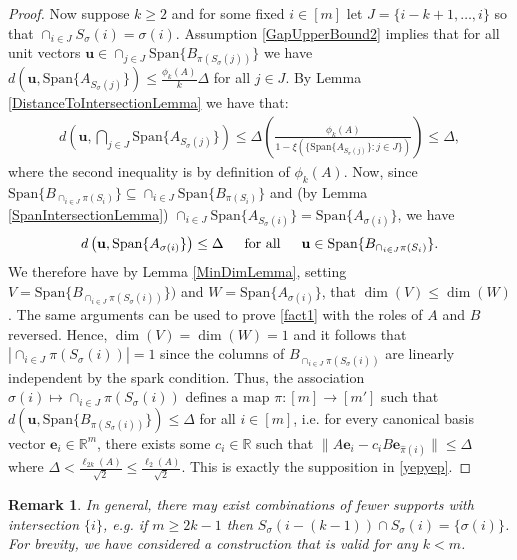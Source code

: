 \documentclass[journal, onecolumn]{IEEEtran}
\newtheorem{remark}{Remark}
\begin{document}
\begin{proof}
Now suppose $k \geq 2$ and for some fixed $i \in [m]$ let $J = \{i-k+1, \ldots, i\}$ so that $\cap_{i \in J} S_\sigma(i) = \sigma(i)$. Assumption \eqref{GapUpperBound2} implies that for all unit vectors $\mathbf{u} \in \cap_{j \in J} \text{Span}\{B_{\pi(S_\sigma(j))}\}$ we have $d(\mathbf{u}, \text{Span}\{A_{S_\sigma(j)}\}) \leq \frac{\phi_k(A)}{k} \Delta$ for all $j \in J$. By Lemma \ref{DistanceToIntersectionLemma} we have that:
\begin{align}\label{sym2}
d\left( \mathbf{u}, \bigcap_{j \in J} \text{Span}\{A_{S_{\sigma}(j)}\} \right) 
\leq \Delta \left( \frac{\phi_k(A)}{1 - \xi(\{ \text{Span}\{A_{S_{\sigma}(j)}\} : j \in J \})} \right) \leq \Delta,
\end{align}
%
where the second inequality is by definition of $\phi_k(A)$. Now, since $\text{Span}\{B_{\cap_{i \in J}\pi(S_i)}\} \subseteq \cap_{i \in J} \text{Span}\{B_{\pi(S_i)}\}$ and (by Lemma \ref{SpanIntersectionLemma}) $\cap_{i \in J}  \text{Span}\{A_{S_\sigma(i)}\} = \text{Span}\{A_{\sigma(i)}\}$, we have
\begin{align}\label{fact1}
d\left( \mathbf{u}, \text{Span}\{A_{\sigma(i)}\} \right) \leq \Delta \indent \text{for all} \indent \mathbf{u} \in \text{Span}\{B_{\cap_{i \in J}\pi(S_i)}\}.
\end{align}
We therefore have by Lemma \ref{MinDimLemma}, setting $V = \text{Span}\{B_{\cap_{i \in J}\pi(S_\sigma(i))}\})$ and $W = \text{Span}\{A_{\sigma(i)}\}$, that $\dim(V) \leq \dim(W)$. The same arguments can be used to prove \eqref{fact1} with the roles of $A$ and $B$ reversed. Hence, $\dim(V) = \dim(W) = 1$ and it follows that $|\cap_{i \in J} \pi(S_\sigma(i))| = 1$ since the columns of $B_{\cap_{i \in J} \pi(S_\sigma(i))}$ are linearly independent by the spark condition. Thus, the association $\sigma(i) \mapsto \cap_{i \in J} \pi(S_\sigma(i))$ defines a map $\pi: [m] \to [m']$ such that $d\left( \mathbf{u}, \text{Span}\{B_{ \pi(S_\sigma(i))}\}\right) \leq \Delta$ for all $i \in [m]$, i.e. for every canonical basis vector $\mathbf{e}_i \in \mathbb{R}^m$, there exists some $c_i \in \mathbb{R}$ such that $\|A\mathbf{e}_i - c_iB\mathbf{e}_{\hat \pi(i)}\| \leq \Delta$ where $\Delta < \frac{\ell_{2k}(A)}{\sqrt{2}} \leq \frac{\ell_{2}(A)}{\sqrt{2}}$. This is exactly the supposition in \eqref{yepyep}.
\end{proof}

\begin{remark} In general, there may exist combinations of fewer supports with intersection $\{i\}$, e.g. if $m \geq 2k-1$ then $S_\sigma(i - (k-1)) \cap S_\sigma(i) = \{\sigma(i)\}$. For brevity, we have considered a construction that is valid for any $k < m$.
\end{remark}
\end{document}
